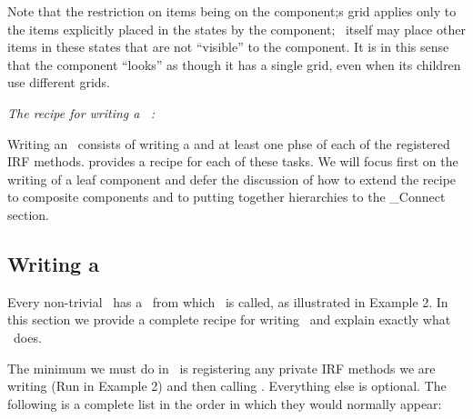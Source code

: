 Note that the restriction on items being on the component;s grid applies only
to the items explicitly placed in the states by the component; \ggn\  itself 
may place other items in these states that are not ``visible'' to
the component. It is in this sense that the component
``looks'' as though it has a single grid, even when its children use 
different grids.




{\em The recipe for writing a \ggn\ :}

Writing an \egc\  consists of writing a \ssv and at least one 
phse of each of the registered IRF methods. \ggn  provides
a recipe for each of these tasks. We will focus first on the
writing of a leaf component and defer the discussion of how to
extend the recipe to composite components and to putting together
hierarchies to the \ggn _Connect section. 

\subsection{Writing a \ssv}


Every non-trivial \ggn\  has a \ssv\  from which \gssv\  is called, 
as illustrated in Example 2. In this section we provide a complete
recipe for writing \ssv\  and explain exactly what \gssv\  does.

The minimum we must do in \ssv\  is 
registering any private IRF methods we are writing (Run in Example 2) and then
calling \gssv. Everything else is optional. The following is a complete list
in the order in which they would normally appear:

